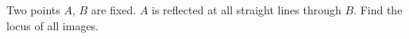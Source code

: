 Two points $A$, $B$ are fixed. $A$ is reflected at all straight lines through $B$. Find the locus of all images.
